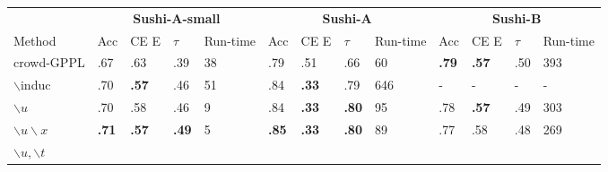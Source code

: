 \begin{table}
\small
\begin{tabularx}{\textwidth}{| p{1.1cm} | X | X | X | p{0.55cm} | X | X | X | p{0.7cm} | X | X | X | p{0.7cm} |}
\hline
& \multicolumn{4}{c|}{\textbf{Sushi-A-small}} & \multicolumn{4}{c|}{\textbf{Sushi-A}} & \multicolumn{4}{c|}{\textbf{Sushi-B}} \\ 
Method & Acc & CE E & $\tau$ & Run-time & Acc & CE E & $\tau$ & Run-time & Acc & CE E & $\tau$ & Run-time \\
\hline\hline
\multicolumn{1}{|b{1.1cm}|}{crowd-GPPL} & .67 & .63 & .39 & 38%
& .79 & .51 & .66 & 60 %
& \textbf{.79} & \textbf{.57} & .50 & 393 \\
$\backslash $induc & .70 & \textbf{.57} & .46 & 51 %
& .84 & \textbf{.33} & .79 & 646 %
& - & - & - & -
\\
$\backslash u$ & .70 & .58 & .46 & 9 %
& .84 & \textbf{.33} & \textbf{.80} & 95 %
& .78 &\textbf{.57} & .49 & 303 \\
$\backslash u \backslash x$ & \textbf{.71} & \textbf{.57} & \textbf{.49} & 5 %
& \textbf{.85} & \textbf{.33} & \textbf{.80} & 89 %
& .77 & .58 & .48 & 269
\\
$\backslash u,\backslash t$ %

\end{tabularx}
\end{table}
